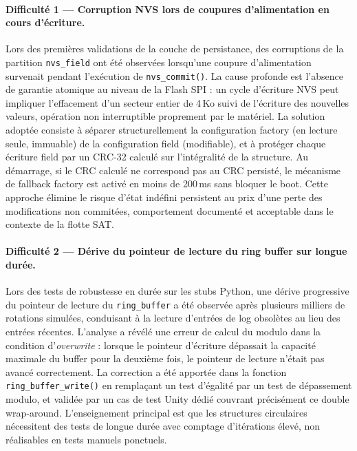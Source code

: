 \paragraph{Difficulté 1 — Corruption NVS lors de coupures d'alimentation
en cours d'écriture.}
Lors des premières validations de la couche de persistance, des
corruptions de la partition \texttt{nvs\_field} ont été observées
lorsqu'une coupure d'alimentation survenait pendant l'exécution de
\texttt{nvs\_commit()}. La cause profonde est l'absence de garantie
atomique au niveau de la Flash SPI : un cycle d'écriture NVS peut
impliquer l'effacement d'un secteur entier de 4\,Ko suivi de l'écriture
des nouvelles valeurs, opération non interruptible proprement par le
matériel. La solution adoptée consiste à séparer structurellement la
configuration factory (en lecture seule, immuable) de la configuration
field (modifiable), et à protéger chaque écriture field par un CRC-32
calculé sur l'intégralité de la structure. Au démarrage, si le CRC
calculé ne correspond pas au CRC persisté, le mécanisme de fallback
factory est activé en moins de 200\,ms sans bloquer le boot. Cette
approche élimine le risque d'état indéfini persistent au prix d'une
perte des modifications non commitées, comportement documenté et
acceptable dans le contexte de la flotte SAT.

\paragraph{Difficulté 2 — Dérive du pointeur de lecture du ring buffer
sur longue durée.}
Lors des tests de robustesse en durée sur les stubs Python, une dérive
progressive du pointeur de lecture du \texttt{ring\_buffer} a été
observée après plusieurs milliers de rotations simulées, conduisant à
la lecture d'entrées de log obsolètes au lieu des entrées récentes.
L'analyse a révélé une erreur de calcul du modulo dans la condition
d'\textit{overwrite} : lorsque le pointeur d'écriture dépassait la
capacité maximale du buffer pour la deuxième fois, le pointeur de
lecture n'était pas avancé correctement. La correction a été apportée
dans la fonction \texttt{ring\_buffer\_write()} en remplaçant un test
d'égalité par un test de dépassement modulo, et validée par un cas
de test Unity dédié couvrant précisément ce double wrap-around.
L'enseignement principal est que les structures circulaires nécessitent
des tests de longue durée avec comptage d'itérations élevé, non
réalisables en tests manuels ponctuels.

